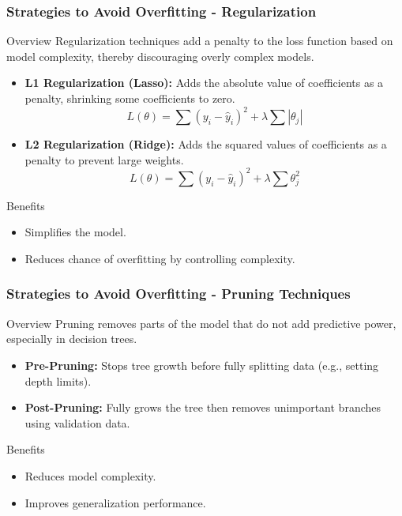 \documentclass[aspectratio=169]{beamer}
\begin{document}
\begin{frame}[fragile]
    \frametitle{Strategies to Avoid Overfitting - Regularization}
    \begin{block}{Overview}
        Regularization techniques add a penalty to the loss function based on model complexity, thereby discouraging overly complex models.
    \end{block}
    
    \begin{itemize}
        \item \textbf{L1 Regularization (Lasso):} Adds the absolute value of coefficients as a penalty, shrinking some coefficients to zero.
            \begin{equation}
                L(\theta) = \sum (y_i - \hat{y}_i)^2 + \lambda \sum |\theta_j| 
            \end{equation}
        \item \textbf{L2 Regularization (Ridge):} Adds the squared values of coefficients as a penalty to prevent large weights.
            \begin{equation}
                L(\theta) = \sum (y_i - \hat{y}_i)^2 + \lambda \sum \theta_j^2 
            \end{equation}
    \end{itemize}
    
    \begin{block}{Benefits}
        \begin{itemize}
            \item Simplifies the model.
            \item Reduces chance of overfitting by controlling complexity.
        \end{itemize}
    \end{block}
\end{frame}

\begin{frame}[fragile]
    \frametitle{Strategies to Avoid Overfitting - Pruning Techniques}
    \begin{block}{Overview}
        Pruning removes parts of the model that do not add predictive power, especially in decision trees.
    \end{block}
    
    \begin{itemize}
        \item \textbf{Pre-Pruning:} Stops tree growth before fully splitting data (e.g., setting depth limits).
        \item \textbf{Post-Pruning:} Fully grows the tree then removes unimportant branches using validation data.
    \end{itemize}
    
    \begin{block}{Benefits}
        \begin{itemize}
            \item Reduces model complexity.
            \item Improves generalization performance.
        \end{itemize}
    \end{block}
\end{frame}
\end{document}
